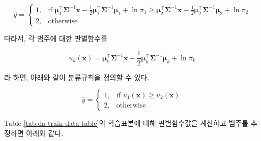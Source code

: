 \documentclass[]{book}
\begin{document}
\begin{equation*}
\hat{y} = \begin{cases}
    1, & \text{if } \boldsymbol\mu_1^\top \boldsymbol\Sigma^{-1}\mathbf{x} - \frac{1}{2} \boldsymbol\mu_1^\top \boldsymbol\Sigma^{-1} \boldsymbol\mu_1 + \ln \pi_1 \ge \boldsymbol\mu_2^\top \boldsymbol\Sigma^{-1}\mathbf{x} - \frac{1}{2} \boldsymbol\mu_2^\top \boldsymbol\Sigma^{-1} \boldsymbol\mu_2 + \ln \pi_2  \\
    2, & \text{otherwise}
\end{cases}
\end{equation*}

따라서, 각 범주에 대한 판별함수를

\begin{equation}
u_k(\mathbf{x}) = \boldsymbol\mu_k^\top \boldsymbol\Sigma^{-1}\mathbf{x} - \frac{1}{2} \boldsymbol\mu_k^\top \boldsymbol\Sigma^{-1} \boldsymbol\mu_k + \ln \pi_k
\label{eq:lda-discriminant-function}
\end{equation}

라 하면, 아래와 같이 분류규칙을 정의할 수 있다.

\begin{equation}
\hat{y} = \begin{cases}
    1, & \text{if } u_1(\mathbf{x}) \ge u_2(\mathbf{x})  \\
    2, & \text{otherwise}
\end{cases}
\label{eq:lda-discriminant-rule}
\end{equation}

Table \ref{tab:da-train-data-table}의 학습표본에 대해 판별함수값을 계산하고 범주를 추정하면 아래와 같다.
\end{document}
